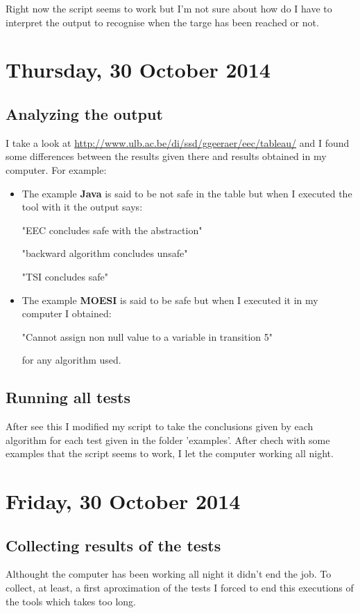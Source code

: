 \documentclass[nochap]{apuntes}
\begin{document}
Right now the script seems to work but I'm not sure about how do I have to interpret the output to recognise when the targe has been reached or not.

\section{Thursday, 30 October 2014}
\subsection{Analyzing the output}
I take a look at \url{http://www.ulb.ac.be/di/ssd/ggeeraer/eec/tableau/} and I found some differences between the results given there and results obtained in my computer. For example:
\begin{itemize}
\item The example \textbf{Java} is said to be not safe in the table but when I executed the tool with it the output says:

"EEC concludes safe with the abstraction"

"backward algorithm concludes unsafe"

"TSI concludes safe"

\item The example \textbf{MOESI} is said to be safe but when I executed it in my computer I obtained:

"Cannot assign non null value to a variable in transition  5"

for any algorithm used.
\end{itemize}

\subsection{Running all tests}
After see this I modified my script to take the conclusions given by each algorithm for each test given in the folder 'examples'. After chech with some examples that the script seems to work, I let the computer working all night.

\section{Friday, 30 October 2014}
\subsection{Collecting results of the tests}
Althought the computer has been working all night it didn't end the job. To collect, at least, a first aproximation of the tests I forced to end this executions of the tools which takes too long.
\end{document}

